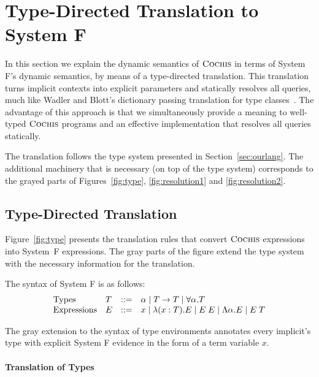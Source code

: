 \section{Type-Directed Translation to System F}
\label{sec:trans}

In this section we explain the dynamic semantics of $\textsc{Cochis}$ in terms
of System F's dynamic semantics, by means of a type-directed translation. 
This translation turns implicit contexts into explicit parameters and
statically resolves all queries, much like Wadler and Blott's dictionary
passing translation for type classes~\cite{adhoc}. 
The advantage of this approach is that we simultaneously provide a meaning to
well-typed $\textsc{Cochis}$ programs and an effective implementation that resolves
all queries statically.

The translation follows the type system presented in Section~\ref{sec:ourlang}.
The additional machinery that is necessary (on top of the type system)
corresponds to the grayed parts of Figures~\ref{fig:type}, \ref{fig:resolution1} and \ref{fig:resolution2}. 

\subsection{Type-Directed Translation}
Figure~\ref{fig:type} presents the translation rules that convert $\textsc{Cochis}$
expressions into System~F expressions. 
The gray parts of the figure extend the type system with the necessary
information for the translation.

The syntax of System F is as follows: 
{\small
  \[ \begin{array}{llrl}
    \text{Types} & T & ::= & \alpha \mid T \rightarrow T 
    \mid \forall \alpha. T \\ 
    \text{Expressions} & E & ::=  & x \mid \lambda (x:T) . E \mid E\;E
    \mid \Lambda \alpha . E \mid E\;T 
  \end{array} \]}

The gray extension to the syntax of type environments annotates every
implicit's type with explicit System F evidence in the form of a 
term variable $x$.

\paragraph{Translation of Types}

